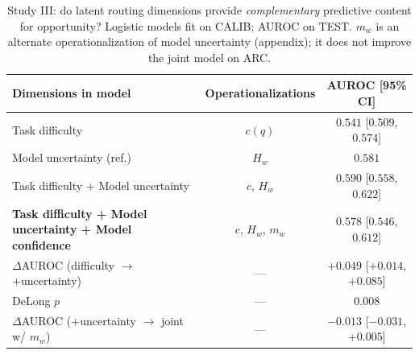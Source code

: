 \begin{table}[t]
  \centering
  \small
  \begin{tabular}{lcc}
    \toprule
    \textbf{Dimensions in model} & \textbf{Operationalizations} & AUROC [95\% CI] \\
    \midrule
    Task difficulty & $c(q)$ & $0.541$ [$0.509$, $0.574$] \\
    Model uncertainty (ref.) & $H_w$ & $0.581$ \\
    Task difficulty + Model uncertainty & $c$, $H_w$ & $0.590$ [$0.558$, $0.622$] \\
    \textbf{Task difficulty + Model uncertainty + Model confidence} & $c$, $H_w$, $m_w$ & $0.578$ [$0.546$, $0.612$] \\
    \midrule
    $\Delta$AUROC (difficulty $\rightarrow$ +uncertainty) & --- & $\mathbf{+0.049}$ [$+0.014$, $+0.085$] \\
    DeLong $p$ & --- & $0.008$ \\
    $\Delta$AUROC (+uncertainty $\rightarrow$ joint w/ $m_w$) & --- & $-0.013$ [$-0.031$, $+0.005$] \\
    \bottomrule
  \end{tabular}
  \caption{Study III: do latent routing dimensions provide \emph{complementary} predictive content for opportunity? Logistic models fit on CALIB; AUROC on TEST. $m_w$ is an alternate operationalization of model uncertainty (appendix); it does not improve the joint model on ARC.}
  \label{tab:complementarity}
\end{table}
